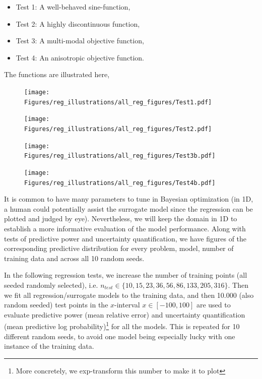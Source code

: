 \begin{itemize}
  \item Test 1: A well-behaved sine-function,
  \item Test 2: A highly discontinuous function,
  \item Test 3: A multi-modal objective function,
  \item Test 4: An anisotropic objective function.
\end{itemize}
The functions are illustrated here,

\begin{figure}[h]
  \centering
  \begin{minipage}[b]{0.24\textwidth}
   \texttt{[image: Figures/reg\_illustrations/all\_reg\_figures/Test1.pdf]}
  \end{minipage}
  \hfill
  \begin{minipage}[b]{0.24\textwidth}
    \texttt{[image: Figures/reg\_illustrations/all\_reg\_figures/Test2.pdf]}
   \end{minipage}
   \hfill
   \begin{minipage}[b]{0.24\textwidth}
    \texttt{[image: Figures/reg\_illustrations/all\_reg\_figures/Test3b.pdf]}
   \end{minipage}
   \hfill
   \begin{minipage}[b]{0.24\textwidth}
     \texttt{[image: Figures/reg\_illustrations/all\_reg\_figures/Test4b.pdf]}
    \end{minipage}

  \label{TEST_problems}
\end{figure}

It is common to have many parameters to tune in Bayesian optimization (in 1D, a human could
potentially assist the surrogate model since the regression can be plotted and judged by eye).
Nevertheless, we will keep the domain in 1D to establish  
a more informative evaluation of the model performance. Along with tests of predictive power and
uncertainty quantification, we have figures of the corresponding predictive distribution for every problem, 
model, number of training data and across all 10 random seeds. 

In the following regression tests, we increase the number of training points (all seeded randomly
selected), i.e. $n_{test} \in \{10, 15, 23, 36, 56, 86, 133, 205, 316\}$. Then we fit all
regression/surrogate models to the training data, and then 10.000 (also random seeded) test points
in the $x$-interval $x \in [-100, 100]$ are used to evaluate predictive power (mean relative error)
and uncertainty quantification (mean predictive log probability)\footnote{More concretely, we 
exp-transform this number to make it to plot} for all the models. This is
repeated for 10 different random seeds, to avoid one model being especially lucky with one instance
of the training data. 

